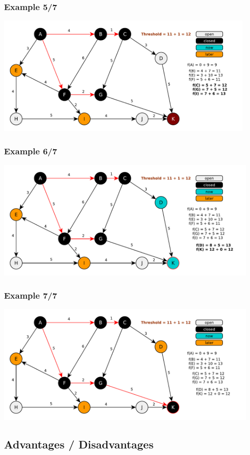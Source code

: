 \documentclass{beamer}
\begin{document}
\begin{frame}
\frametitle{Example 5/7}
\includegraphics[height=165pt]{fringe5.pdf}
\end{frame}
\begin{frame}
\frametitle{Example 6/7}
\includegraphics[height=165pt]{fringe6.pdf}
\end{frame}
\begin{frame}
\frametitle{Example 7/7}
\includegraphics[height=165pt]{fringe7.pdf}
\end{frame}


\subsection{Advantages / Disadvantages}
\end{document}
